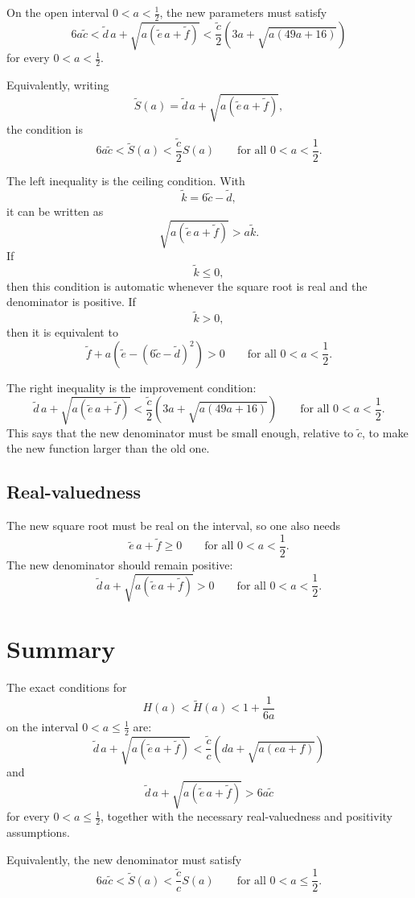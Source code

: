 \documentclass[11pt]{article}
\begin{document}
On the open interval \(0<a<\frac12\), the new parameters must satisfy
\[
\boxed{
6a\widetilde c
<
\widetilde d\,a+\sqrt{a(\widetilde e\,a+\widetilde f)}
<
\frac{\widetilde c}{2}
\left(
3a+\sqrt{a(49a+16)}
\right)
}
\]
for every \(0<a<\frac12\).

Equivalently, writing
\[
\widetilde S(a)
=
\widetilde d\,a+\sqrt{a(\widetilde e\,a+\widetilde f)},
\]
the condition is
\[
\boxed{
6a\widetilde c
<
\widetilde S(a)
<
\frac{\widetilde c}{2}S(a)
\qquad
\text{for all }0<a<\frac12.
}
\]

The left inequality is the ceiling condition. With
\[
\widetilde k=6\widetilde c-\widetilde d,
\]
it can be written as
\[
\sqrt{a(\widetilde e\,a+\widetilde f)}
>
a\widetilde k.
\]
If
\[
\widetilde k\le 0,
\]
then this condition is automatic whenever the square root is real and the denominator is positive.
If
\[
\widetilde k>0,
\]
then it is equivalent to
\[
\boxed{
\widetilde f
+
a\left(\widetilde e-(6\widetilde c-\widetilde d)^2\right)
>0
\qquad
\text{for all }0<a<\frac12.
}
\]

The right inequality is the improvement condition:
\[
\boxed{
\widetilde d\,a+\sqrt{a(\widetilde e\,a+\widetilde f)}
<
\frac{\widetilde c}{2}
\left(
3a+\sqrt{a(49a+16)}
\right)
\qquad
\text{for all }0<a<\frac12.
}
\]
This says that the new denominator must be small enough, relative to \(\widetilde c\), to make the new function larger than the old one.

\subsection*{Real-valuedness}

The new square root must be real on the interval, so one also needs
\[
\boxed{
\widetilde e\,a+\widetilde f\ge 0
\qquad
\text{for all }0<a<\frac12.
}
\]
The new denominator should remain positive:
\[
\boxed{
\widetilde d\,a+\sqrt{a(\widetilde e\,a+\widetilde f)}>0
\qquad
\text{for all }0<a<\frac12.
}
\]

\section{Summary}

The exact conditions for
\[
H(a)<\widetilde H(a)<1+\frac{1}{6a}
\]
on the interval \(0<a\le\frac12\) are:
\[
\boxed{
\widetilde d\,a+\sqrt{a(\widetilde e\,a+\widetilde f)}
<
\frac{\widetilde c}{c}
\left(
da+\sqrt{a(ea+f)}
\right)
}
\]
and
\[
\boxed{
\widetilde d\,a+\sqrt{a(\widetilde e\,a+\widetilde f)}
>
6a\widetilde c
}
\]
for every \(0<a\le\frac12\), together with the necessary real-valuedness and positivity assumptions.

Equivalently, the new denominator must satisfy
\[
\boxed{
6a\widetilde c
<
\widetilde S(a)
<
\frac{\widetilde c}{c}S(a)
\qquad
\text{for all }0<a\le\frac12.
}
\]
\end{document}
